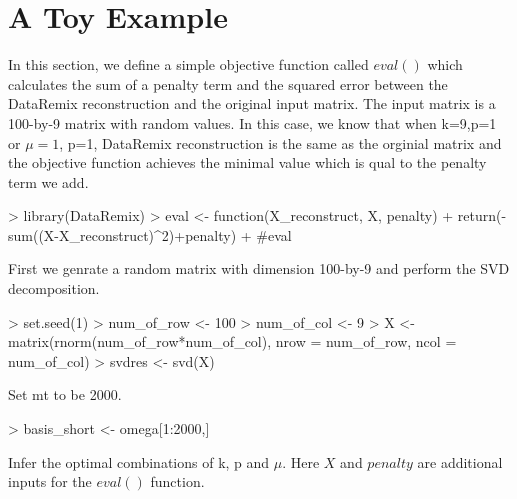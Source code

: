 \documentclass{article}
\begin{document}


\section{A Toy Example}
In this section, we define a simple objective function called $eval()$ which calculates the sum of a penalty term and the squared error between the DataRemix reconstruction and the original input matrix. The input matrix is a 100-by-9 matrix with random values. In this case, we know that when k=9,p=1 or $\mu=1$, p=1, DataRemix reconstruction is the same as the orginial matrix and the objective function achieves the minimal value which is qual to the penalty term we add. 
\begin{Schunk}
\begin{Sinput}
> library(DataRemix)
> eval <- function(X_reconstruct, X, penalty){
+   return(-sum((X-X_reconstruct)^2)+penalty)
+ }#eval
\end{Sinput}
\end{Schunk}
First we genrate a random matrix with dimension 100-by-9 and perform the SVD decomposition.
\begin{Schunk}
\begin{Sinput}
> set.seed(1)
> num_of_row <- 100
> num_of_col <- 9
> X <- matrix(rnorm(num_of_row*num_of_col), nrow = num_of_row, ncol = num_of_col)
> svdres <- svd(X)
\end{Sinput}
\end{Schunk}
Set mt to be 2000.
\begin{Schunk}
\begin{Sinput}
> basis_short <- omega[1:2000,]
\end{Sinput}
\end{Schunk}
Infer the optimal combinations of k, p and $\mu$. Here $X$ and $penalty$ are additional inputs for the $eval()$ function.
\end{document}
